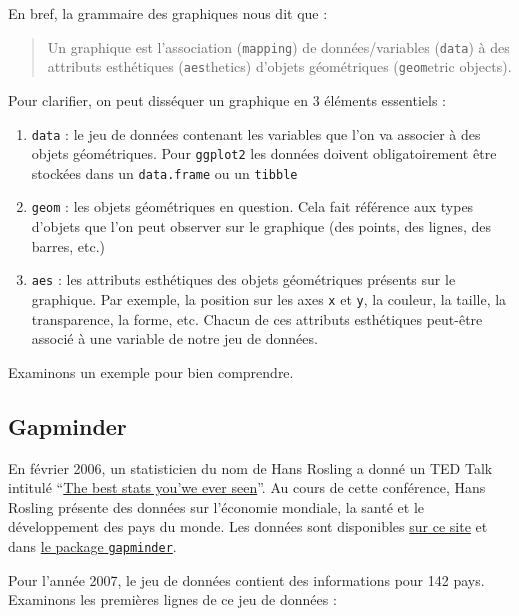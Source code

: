 \documentclass[
  letterpaper,
  DIV=11,
  numbers=noendperiod]{scrreprt}
\providecommand{\tightlist}{%
  \setlength{\itemsep}{0pt}\setlength{\parskip}{0pt}}\usepackage{longtable,booktabs,array}
\begin{document}
En bref, la grammaire des graphiques nous dit que :

\begin{quote}
Un graphique est l'association (\texttt{mapping}) de données/variables
(\texttt{data}) à des attributs esthétiques (\texttt{aes}thetics)
d'objets géométriques (\texttt{geom}etric objects).
\end{quote}

Pour clarifier, on peut disséquer un graphique en 3 éléments essentiels
:

\begin{enumerate}
\def\labelenumi{\arabic{enumi}.}
\tightlist
\item
  \texttt{data} : le jeu de données contenant les variables que l'on va
  associer à des objets géométriques. Pour \texttt{ggplot2} les données
  doivent obligatoirement être stockées dans un \texttt{data.frame} ou
  un \texttt{tibble}
\item
  \texttt{geom} : les objets géométriques en question. Cela fait
  référence aux types d'objets que l'on peut observer sur le graphique
  (des points, des lignes, des barres, etc.)
\item
  \texttt{aes} : les attributs esthétiques des objets géométriques
  présents sur le graphique. Par exemple, la position sur les axes
  \texttt{x} et \texttt{y}, la couleur, la taille, la transparence, la
  forme, etc. Chacun de ces attributs esthétiques peut-être associé à
  une variable de notre jeu de données.
\end{enumerate}

Examinons un exemple pour bien comprendre.

\hypertarget{gapminder}{%
\subsection{Gapminder}\label{gapminder}}

En février 2006, un statisticien du nom de Hans Rosling a donné un TED
Talk intitulé
``\href{https://www.ted.com/talks/hans_rosling_shows_the_best_stats_you_ve_ever_seen}{The
best stats you'we ever seen}''. Au cours de cette conférence, Hans
Rosling présente des données sur l'économie mondiale, la santé et le
développement des pays du monde. Les données sont disponibles
\href{https://www.gapminder.org/tools/\#$chart-type=bubbles}{sur ce
site} et dans
\href{https://cran.r-project.org/web/packages/gapminder/index.html}{le
package \texttt{gapminder}}.

Pour l'année 2007, le jeu de données contient des informations pour 142
pays. Examinons les premières lignes de ce jeu de données :
\end{document}
